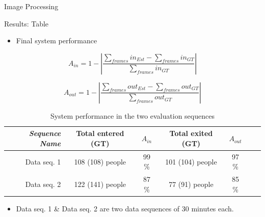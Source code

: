 \documentclass[final,hyperref={pdfpagelabels=false}]{beamer}
\begin{document}
\begin{frame}[t]
\begin{columns}[t]
\begin{column}{.465\textwidth}
\begin{block}{Image Processing}
\end{block}






\begin{block}{Results: Table}

\begin{itemize}
\item Final system performance
\end{itemize}

\begin{equation}
\label{eq:in_accuracy}
A_{in} = 1 - |\frac{\sum_{frames}{in_{Est}}-\sum_{frames}{in_{GT}}}{\sum_{frames}in_{GT}}|
\end{equation} 

\begin{equation}
\label{eq:out_accuracy}
A_{out} = 1 - |\frac{\sum_{frames}{out_{Est}}-\sum_{frames}out_{GT}}{\sum_{frames}out_{GT}}| 
\end{equation} 


\begin{table}[h]
\centering
	\begin{tabular}{r | c | c | c | c | c | c }
		\emph{Sequence Name}		&  Total entered (GT) & \emph{$A_{in}$} & Total exited (GT) & \emph{$A_{out}$} \\
		\hline \hline
		Data seq. 1			& 108 (108) people & 99 \% & 101 (104) people & 97 \% \\
		Data seq. 2			& 122 (141) people & 87 \% & 77 (91) people & 85 \%  \\
		\end{tabular}
	\caption{System performance in the two evaluation sequences}
\end{table}

\begin{itemize}
\item Data seq. 1 \& Data seq. 2 are two data sequences of 30 minutes each. 
\end{itemize}
     
\end{block}




\end{column}
\end{columns}
\end{frame}
\end{document}
